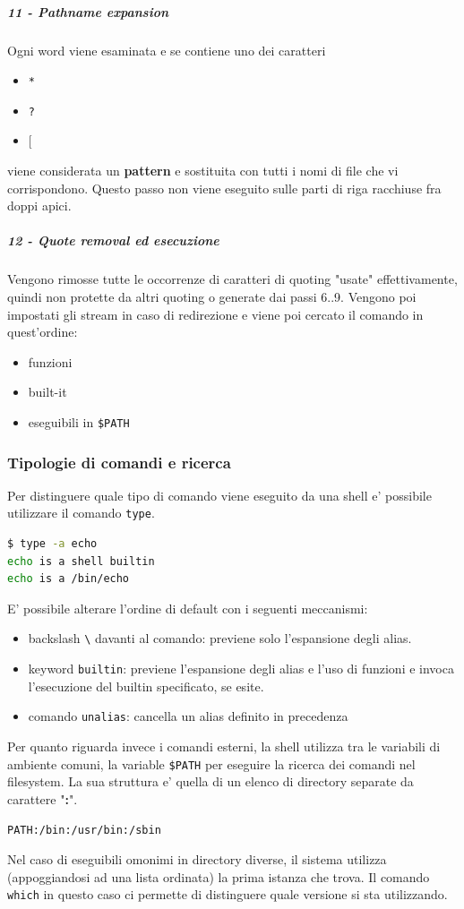 \subparagraph{11 - Pathname expansion}
Ogni word viene esaminata e se contiene uno dei caratteri

\begin{itemize}
	\item \texttt{*}
	\item \texttt{?}
	\item \texttt{$[$}
\end{itemize}
viene considerata un \textbf{pattern} e sostituita con tutti i nomi di file che vi corrispondono.
Questo passo non viene eseguito sulle parti di riga racchiuse fra doppi apici.


\subparagraph{12 - Quote removal ed esecuzione}
Vengono rimosse tutte le occorrenze di caratteri di quoting "usate" effettivamente, quindi non protette
da altri quoting o generate dai passi 6..9. Vengono poi impostati gli stream in caso di redirezione e viene
poi cercato il comando in quest'ordine:
\begin{itemize}
	\item funzioni
	\item built-it
	\item eseguibili in \texttt{\$PATH}
\end{itemize}

\subsubsection{Tipologie di comandi e ricerca}
Per distinguere quale tipo di comando viene eseguito da una shell e' possibile utilizzare il comando 
\texttt{type}.

\begin{lstlisting}[language=bash,basicstyle=\ttfamily,frame=single]
$ type -a echo
echo is a shell builtin
echo is a /bin/echo
\end{lstlisting}
E' possibile alterare l'ordine di default con i seguenti meccanismi:
\begin{itemize}
	\item backslash \texttt{\textbackslash} davanti al comando: previene solo l'espansione degli alias.
	\item keyword \texttt{builtin}: previene l'espansione degli alias e l'uso di funzioni e invoca
		l'esecuzione del builtin specificato, se esite.
	\item comando \texttt{unalias}: cancella un alias definito in precedenza
\end{itemize}
Per quanto riguarda invece i comandi esterni, la shell utilizza tra le variabili di ambiente comuni,
la variable \texttt{\$PATH} per eseguire la ricerca dei comandi nel filesystem. La sua struttura e' quella
di un elenco di directory separate da carattere "\textbf{:}".
\begin{center}
	\texttt{PATH:/bin:/usr/bin:/sbin}
\end{center}
Nel caso di eseguibili omonimi in directory diverse, il sistema utilizza (appoggiandosi ad una lista ordinata)
la prima istanza che trova. Il comando \texttt{which} in questo caso ci permette di distinguere quale versione
si sta utilizzando.


